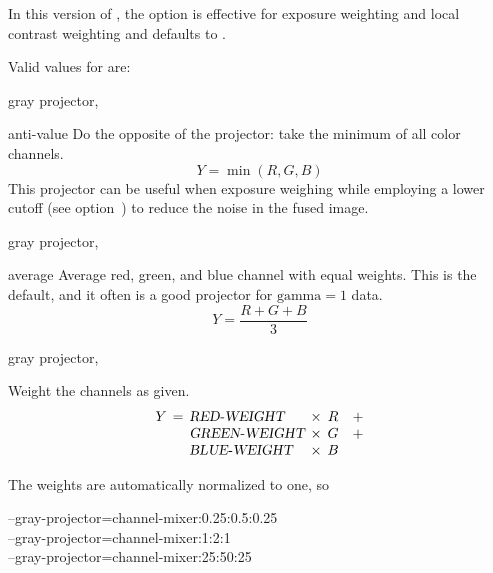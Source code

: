 \begin{codelist}
  In this version of \App{}, the option is effective for exposure weighting and local contrast
  weighting and  defaults to .

  Valid values for  are:

  \begin{codelist}
           {gray projector, }%
  \item[anti-value]\itemend
    Do the opposite of the  projector: take the minimum of all color channels.
    \[
    Y = \min(R, G, B)
    \]
    This projector can be useful when exposure weighing while employing a lower cutoff (see
    option~) to reduce the noise in the fused image.

           {gray projector, }%
  \item[average]\itemend
    Average red, green, and blue channel with equal weights.  This is the default, and it often
    is a good projector for $\mbox{gamma} = 1$ data.
    \[
    Y = \frac{R + G + B}{3}
    \]

           {gray projector, }%
  \item[\itempar{channel-mixer:\metavar{RED-WEIGHT}:\feasiblebreak
    \metavar{GREEN-WEIGHT}:\feasiblebreak\metavar{BLUE-WEIGHT}}]\itemend
    Weight the channels as given.
    \[
    \begin{array}{r@{\hspace{1ex}}c@{\hspace{1ex}}l@{\hspace{1ex}}c@{\hspace{1ex}}cc}
      Y & = & \metavar{RED-WEIGHT}   & \times & R & + \\
        &   & \metavar{GREEN-WEIGHT} & \times & G & + \\
        &   & \metavar{BLUE-WEIGHT}  & \times & B &
    \end{array}
    \]

    The weights are automatically normalized to one, so

    \begin{literal}
      --gray-projector=channel-mixer:0.25:0.5:0.25 \\
      --gray-projector=channel-mixer:1:2:1 \\
      --gray-projector=channel-mixer:25:50:25
    \end{literal}


\end{codelist}
\end{codelist}
